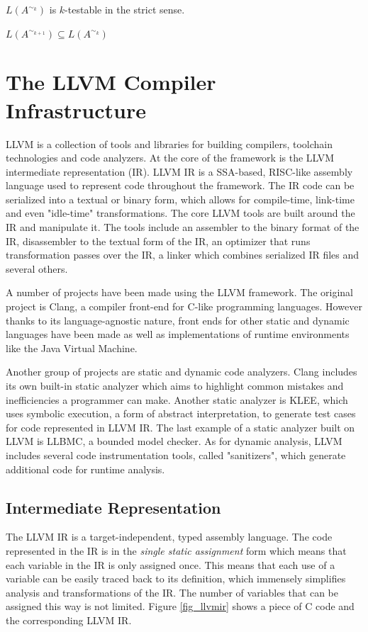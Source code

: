 \begin{thm}
$L(A^{\sim_k})$ is $k$-testable in the strict sense.
\end{thm}

\begin{thm}
$L(A^{\sim_{k+1}}) \subseteq L(A^{\sim_k})$
\end{thm}

\section{The \textsc{LLVM} Compiler Infrastructure}
\textsc{LLVM} is a collection of tools and libraries for building compilers, toolchain technologies and code analyzers. At the core of the framework is the \textsc{LLVM} intermediate representation (IR). \textsc{LLVM IR} is a \textsc{SSA}-based, \textsc{RISC}-like assembly language used to represent code throughout the framework. The IR code can be serialized into a textual or binary form, which allows for compile-time, link-time and even "idle-time" transformations. The core \textsc{LLVM} tools are built around the IR and manipulate it. The tools include an assembler to the binary format of the IR, disassembler to the textual form of the IR, an optimizer that runs transformation passes over the IR, a linker which combines serialized IR files and several others.

A number of projects have been made using the \textsc{LLVM} framework. The original project is Clang, a compiler front-end for C-like programming languages. However thanks to its language-agnostic nature, front ends for other static and dynamic languages have been made as well as implementations of runtime environments like the Java Virtual Machine.

Another group of projects are static and dynamic code analyzers. Clang includes its own built-in static analyzer which aims to highlight common mistakes and inefficiencies a programmer can make. Another static analyzer is \textsc{KLEE}, which uses symbolic execution, a form of abstract interpretation, to generate test cases for code represented in \textsc{LLVM IR}. The last example of a static analyzer built on \textsc{LLVM} is \textsc{LLBMC}, a bounded model checker. As for dynamic analysis, \textsc{LLVM} includes several code instrumentation tools, called "sanitizers", which generate additional code for runtime analysis.

\subsection{Intermediate Representation}
The \textsc{LLVM IR} is a target-independent, typed assembly language. The code represented in the IR is in the \emph{single static assignment} form which means that each variable in the IR is only assigned once. This means that each use of a variable can be easily traced back to its definition, which immensely simplifies analysis and transformations of the IR. The number of variables that can be assigned this way is not limited. Figure \ref{fig_llvmir} shows a piece of C code and the corresponding \textsc{LLVM IR}.

